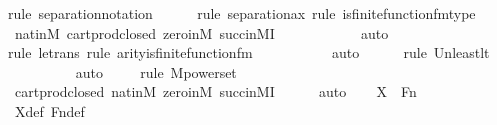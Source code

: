 \begin{isabellebody}
{\isacharparenleft}{\kern0pt}rule\ separation{\isacharunderscore}{\kern0pt}notation{\isacharparenright}{\kern0pt}\isanewline
\ \ \ \ \ \isamarkupfalse%
{\isacharparenleft}{\kern0pt}rule\ separation{\isacharunderscore}{\kern0pt}ax{\isacharcomma}{\kern0pt}\ rule\ is{\isacharunderscore}{\kern0pt}finite{\isacharunderscore}{\kern0pt}function{\isacharunderscore}{\kern0pt}fm{\isacharunderscore}{\kern0pt}type{\isacharparenright}{\kern0pt}\isanewline
\ \ \ \ \isamarkupfalse%
\ nat{\isacharunderscore}{\kern0pt}in{\isacharunderscore}{\kern0pt}M\ cartprod{\isacharunderscore}{\kern0pt}closed\ zero{\isacharunderscore}{\kern0pt}in{\isacharunderscore}{\kern0pt}M\ succ{\isacharunderscore}{\kern0pt}in{\isacharunderscore}{\kern0pt}MI\isanewline
\ \ \ \ \ \ \ \ \ \ \isamarkupfalse%
\ auto{\isacharbrackleft}{\kern0pt}{}{\isacharbrackright}{\kern0pt}\isanewline
\ \ \ \ \ \isamarkupfalse%
{\isacharparenleft}{\kern0pt}rule\ le{\isacharunderscore}{\kern0pt}trans{\isacharcomma}{\kern0pt}\ rule\ arity{\isacharunderscore}{\kern0pt}is{\isacharunderscore}{\kern0pt}finite{\isacharunderscore}{\kern0pt}function{\isacharunderscore}{\kern0pt}fm{\isacharparenright}{\kern0pt}\isanewline
\ \ \ \ \ \ \ \ \ \isamarkupfalse%
\ auto{\isacharbrackleft}{\kern0pt}{}{\isacharbrackright}{\kern0pt}\isanewline
\ \ \ \ \ \isamarkupfalse%
{\isacharparenleft}{\kern0pt}rule\ Un{\isacharunderscore}{\kern0pt}least{\isacharunderscore}{\kern0pt}lt{\isacharparenright}{\kern0pt}{\isacharplus}{\kern0pt}\isanewline
\ \ \ \ \ \ \ \ \isamarkupfalse%
\ auto{\isacharbrackleft}{\kern0pt}{}{\isacharbrackright}{\kern0pt}\isanewline
\ \ \ \ \isamarkupfalse%
{\isacharparenleft}{\kern0pt}rule\ M{\isacharunderscore}{\kern0pt}powerset{\isacharparenright}{\kern0pt}\isanewline
\ \ \ \ \isamarkupfalse%
\ cartprod{\isacharunderscore}{\kern0pt}closed\ nat{\isacharunderscore}{\kern0pt}in{\isacharunderscore}{\kern0pt}M\ zero{\isacharunderscore}{\kern0pt}in{\isacharunderscore}{\kern0pt}M\ succ{\isacharunderscore}{\kern0pt}in{\isacharunderscore}{\kern0pt}MI\isanewline
\ \ \ \ \isamarkupfalse%
\ auto\isanewline
\isanewline
\ \ \isamarkupfalse%
\ {\isachardoublequoteopen}X\ {\isacharequal}{\kern0pt}\ Fn{\isachardoublequoteclose}\ \isanewline
\ \ \ \ \isamarkupfalse%
\ X{\isacharunderscore}{\kern0pt}def\ Fn{\isacharunderscore}{\kern0pt}def\ \isanewline
\ \ \ \ \isamarkupfalse%

\end{isabellebody}
